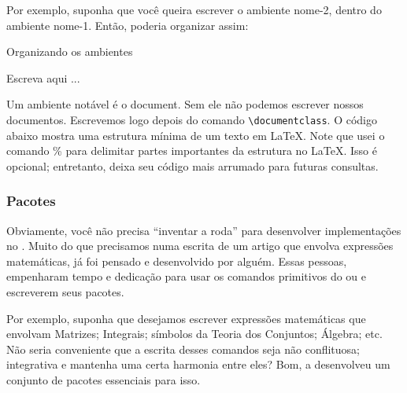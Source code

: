 Por exemplo, suponha que você queira escrever o ambiente \textsf{nome-2}, dentro
do ambiente \textsf{nome-1}. 
Então, poderia organizar assim: 

\begin{codigo}{Organizando os ambientes}{\lapis}
\begin{nome-1}
  \begin{nome-2}
    Escreva aqui ...
  \end{nome-2}
\end{nome-1}
\end{codigo}

Um ambiente notável é o \textsf{document}. 
Sem ele não podemos escrever nossos documentos. 
Escrevemos logo depois do comando \Verb|\documentclass|. 
O código abaixo mostra uma estrutura mínima de um texto em \LaTeX. 
Note que usei o comando \textsf{\%} para delimitar partes importantes da 
estrutura no \LaTeX.
Isso é opcional; entretanto, deixa seu código mais arrumado para futuras consultas.


%
  \subsubsection{Pacotes}
%
Obviamente, você não precisa ``inventar a roda'' para desenvolver implementações 
no .
Muito do que precisamos numa escrita de um artigo que envolva expressões matemáticas, 
já foi pensado e desenvolvido por alguém. 
Essas pessoas, empenharam tempo e dedicação para usar os comandos primitivos do 
 ou  e escreverem seus \textsf{pacotes}.

Por exemplo, suponha que desejamos escrever expressões matemáticas que envolvam 
\textsf{Matrizes}; \textsf{Integrais}; símbolos da \textsf{Teoria dos Conjuntos};
\textsf{Álgebra}; etc.
Não seria conveniente que a escrita desses comandos seja não conflituosa; 
integrativa e mantenha uma certa harmonia entre eles?
Bom, a  desenvolveu um conjunto de pacotes essenciais para isso.

